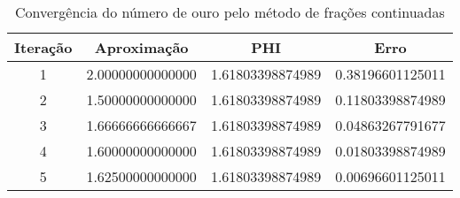 \begin{table}[H]
\centering 
\begin{tabular}{|c|c|c|c|}
\hline 
Iteração & Aproximação &  PHI & Erro \\ 
\hline 
1 & 2.00000000000000 &  1.61803398874989 & 0.38196601125011 \\ 
 \hline
2 & 1.50000000000000 &  1.61803398874989 & 0.11803398874989 \\ 
 \hline
3 & 1.66666666666667 &  1.61803398874989 & 0.04863267791677 \\ 
 \hline
4 & 1.60000000000000 &  1.61803398874989 & 0.01803398874989 \\ 
 \hline
5 & 1.62500000000000 &  1.61803398874989 & 0.00696601125011 \\ 
 \hline
\end{tabular}\label{table:phi-frac}\caption{Convergência do número de ouro pelo método de frações continuadas}\end{table}